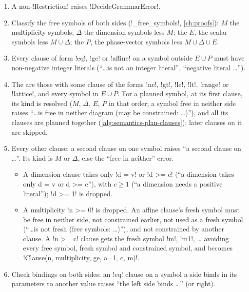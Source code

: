 \begin{algorithm}\label{alg:semantics-validate-restriction}
\begin{enumerate}
\item A non-\py!Restriction! raises \py!DecideGrammarError!.
\item Classify the free symbols of both sides (\py!_free_symbols!, \cref{ch:proofs}): $M$ the multiplicity symbols; $\Delta$ the dimension symbols less $M$; the  $E$, the scalar symbols less $M\cup\Delta$; the  $P$, the phase-vector symbols less $M\cup\Delta\cup E$.
\item Every clause of form \code!eq!, \code!ge! or \code!affine! on a symbol outside $E\cup P$ must have non-negative integer literals (``\ldots is not an integer literal'', ``negative literal \ldots'').
\item The  are those with some clause of the forms \code!ne!, \code!gt!, \code!le!, \code!lt!, \code!range! or \code!lattice!, and every symbol in $E\cup P$. For a planned symbol, at its first clause, its kind is resolved ($M$, $\Delta$, $E$, $P$ in that order; a symbol free in neither side raises ``\ldots is free in neither diagram (may be constrained: \ldots)''), and all its clauses are planned together (\cref{alg:semantics-plan-clauses}); later clauses on it are skipped.
\item Every other clause: a second clause on one symbol raises ``a second clause on \ldots''. Its kind is $M$ or $\Delta$, else the ``free in neither'' error.
  \begin{itemize}
  \item A dimension clause takes only \code!d = v! or \code!d >= c! (``a dimension takes only d = v or d >= c''), with $c\ge1$ (``a dimension needs a positive literal''); \code!d >= 1! is dropped.
  \item A multiplicity \code!n >= 0! is dropped. An affine clause's fresh symbol must be free in neither side, not constrained earlier, not used as a fresh symbol (``\ldots is not fresh (free symbols: \ldots)''), and not constrained by another clause. A \code!n >= c! clause gets the fresh symbol \code!m!, \code!m1!, \ldots{} avoiding every free symbol, fresh symbol and constrained symbol, and becomes \code!Clause(n, multiplicity, ge, a=1, c, m)!.
  \end{itemize}
\item Check bindings on both sides: an \code!eq! clause on a symbol a side binds in its parameters to another value raises ``the left side binds \ldots'' (or right).
\end{enumerate}
\end{algorithm}

